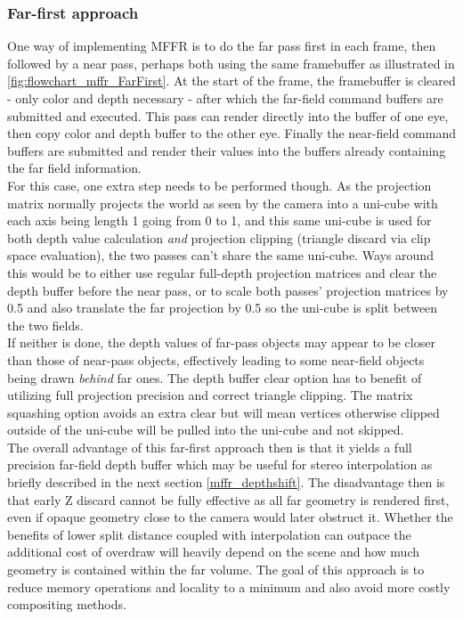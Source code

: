 \subsubsection{Far-first approach}
One way of implementing MFFR is to do the far pass first in each frame, then followed by a near pass, perhaps both using the same framebuffer as illustrated in \autoref{fig:flowchart_mffr_FarFirst}. At the start of the frame, the framebuffer is cleared - only color and depth necessary - after which the far-field command buffers are submitted and executed. This pass can render directly into the buffer of one eye, then copy color and depth buffer to the other eye. Finally the near-field command buffers are submitted and render their values into the buffers already containing the far field information. \\
For this case, one extra step needs to be performed though. As the projection matrix normally projects the world as seen by the camera into a uni-cube with each axis being length 1 going from 0 to 1, and this same uni-cube is used for both depth value calculation \textit{and} projection clipping (triangle discard via clip space evaluation), the two passes can't share the same uni-cube. Ways around this would be to either use regular full-depth projection matrices and clear the depth buffer before the near pass, or to scale both passes' projection matrices by 0.5 and also translate the far projection by 0.5 so the uni-cube is split between the two fields. \\
If neither is done, the depth values of far-pass objects may appear to be closer than those of near-pass objects, effectively leading to some near-field objects being drawn \textit{behind} far ones. 
The depth buffer clear option has to benefit of utilizing full projection precision and correct triangle clipping. The matrix squashing option avoids an extra clear but will mean vertices otherwise clipped outside of the uni-cube will be pulled into the uni-cube and not skipped. \\
The overall advantage of this far-first approach then is that it yields a full precision far-field depth buffer which may be useful for stereo interpolation as briefly described in the next section \autoref{mffr_depthshift}. The disadvantage then is that early Z discard cannot be fully effective as all far geometry is rendered first, even if opaque geometry close to the camera would later obstruct it. Whether the benefits of lower split distance coupled with interpolation can outpace the additional cost of overdraw will heavily depend on the scene and how much geometry is contained within the far volume. 
The goal of this approach is to reduce memory operations and locality to a minimum and also avoid more costly compositing methods. 
